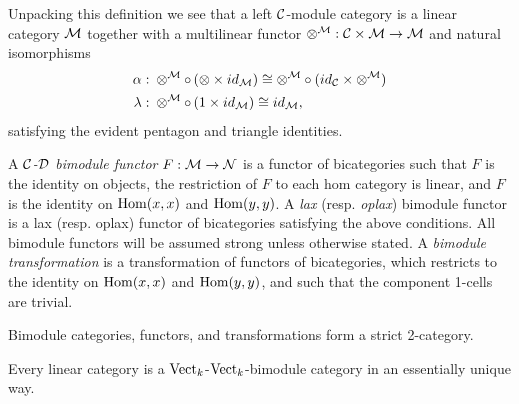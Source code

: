 \documentclass[a4paper]{amsart}
\begin{document}
Unpacking this definition we see that a left $\mathcal C$-module category is a linear category $\mathcal M$ together with a multilinear functor $\otimes^{\mathcal M}: \mathcal C \times \mathcal M \to \mathcal M$ and natural isomorphisms
	\begin{align*}
		\alpha: & \;    \otimes^{\mathcal M} \circ \, (\otimes \times id_{\mathcal M}) \cong  \otimes^{\mathcal M} \circ (id_{\mathcal C} \times \otimes^{\mathcal M}) \\
		\lambda: & \; \otimes^{\mathcal M} \circ \, (1 \times id_{\mathcal M}) \cong id_{\mathcal M},
	\end{align*}
	satisfying the evident pentagon and triangle identities. 

\begin{definition}		
A {\em $\mathcal C$-$\mathcal D$ bimodule functor} $F:\mathcal M \to \mathcal N$ is a functor of bicategories such that %
		 $F$ is the identity on objects,
		  the restriction of $F$ to each hom category is linear,
		 and $F$ is the identity on $\operatorname{Hom}(x,x)$ and $\operatorname{Hom}(y,y)$.
A {\em lax} (resp. {\em oplax}) bimodule functor is a lax (resp. oplax) functor of bicategories satisfying the above conditions. All bimodule functors will be assumed strong unless otherwise stated. 
	A {\em bimodule transformation} is a transformation of functors of bicategories, which restricts to the identity on $\operatorname{Hom}(x,x)$ and $\operatorname{Hom}(y,y)$, and such that the component 1-cells are trivial.  
\end{definition}
	
%
Bimodule categories, functors, and transformations form a strict 2-category.

\begin{example}
	Every linear category is a $\mathrm{Vect}_k$-$\mathrm{Vect}_k$-bimodule category in an essentially unique way. 
\end{example}
\end{document}
